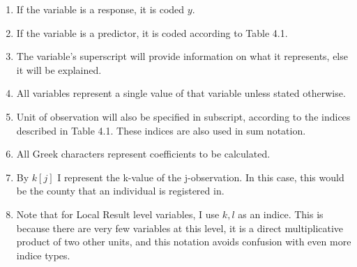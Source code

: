 \documentclass[12pt,twoside]{reedthesis}
\providecommand{\tightlist}{%
  \setlength{\itemsep}{0pt}\setlength{\parskip}{0pt}}
\begin{document}
  \begin{enumerate}
  \def\labelenumi{\arabic{enumi}.}
  \tightlist
  \item
    If the variable is a response, it is coded \(y\).
  \item
    If the variable is a predictor, it is coded according to Table 4.1.
  \item
    The variable's superscript will provide information on what it
    represents, else it will be explained.
  \item
    All variables represent a single value of that variable unless stated
    otherwise.
  \item
    Unit of observation will also be specified in subscript, according to
    the indices described in Table 4.1. These indices are also used in sum
    notation.
  \item
    All Greek characters represent coefficients to be calculated.
  \item
    By \(k[j]\) I represent the k-value of the j-observation. In this
    case, this would be the county that an individual is registered in.
  \item
    Note that for Local Result level variables, I use \(k,l\) as an
    indice. This is because there are very few variables at this level, it
    is a direct multiplicative product of two other units, and this
    notation avoids confusion with even more indice types.
  \end{enumerate}
  
\end{document}
